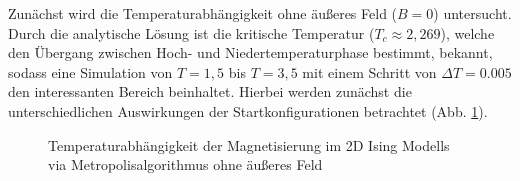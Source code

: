 Zunächst wird die Temperaturabhängigkeit ohne äußeres Feld ($B=0$) untersucht. Durch die analytische Lösung ist die kritische Temperatur ($T_{c}\approx 2,269$), welche den Übergang zwischen Hoch- und Niedertemperaturphase bestimmt, bekannt, sodass eine Simulation von $T=1,5$ bis $T=3,5$ mit einem Schritt von $\Delta T = 0.005$ den interessanten Bereich beinhaltet. Hierbei werden zunächst die unterschiedlichen Auswirkungen der Startkonfigurationen betrachtet (Abb. \ref{mp2d0modes}).
\begin{figure}[H]
	\centering
	\caption{Temperaturabhängigkeit der Magnetisierung im 2D Ising Modells via Metropolisalgorithmus ohne äußeres Feld}
	\label{mp2d0modes}
\end{figure}
